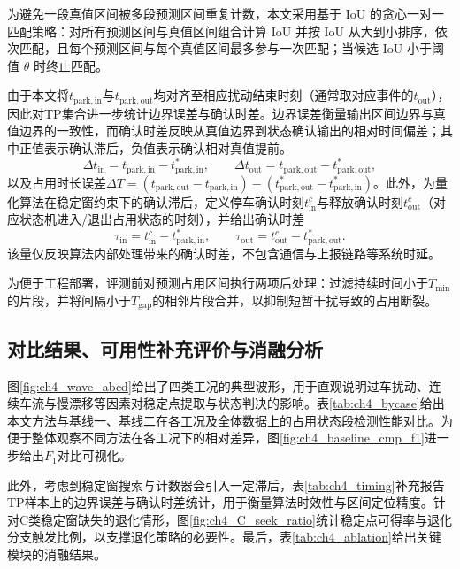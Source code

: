 为避免一段真值区间被多段预测区间重复计数，本文采用基于 IoU 的贪心一对一匹配策略：对所有预测区间与真值区间组合计算 IoU 并按 IoU 从大到小排序，依次匹配，且每个预测区间与每个真值区间最多参与一次匹配；当候选 IoU 小于阈值 $\theta$ 时终止匹配。

由于本文将$t_{\mathrm{park,in}}$与$t_{\mathrm{park,out}}$均对齐至相应扰动结束时刻（通常取对应事件的$t_{\mathrm{out}}$），因此对TP集合进一步统计边界误差与确认时差。边界误差衡量输出区间边界与真值边界的一致性，而确认时差反映从真值边界到状态确认输出的相对时间偏差；其中正值表示确认滞后，负值表示确认相对真值提前。
\begin{equation}
    \Delta t_{\mathrm{in}}=t_{\mathrm{park,in}}-t^{*}_{\mathrm{park,in}},\qquad
    \Delta t_{\mathrm{out}}=t_{\mathrm{park,out}}-t^{*}_{\mathrm{park,out}},
\end{equation}
以及占用时长误差$\Delta T=(t_{\mathrm{park,out}}-t_{\mathrm{park,in}})-(t^{*}_{\mathrm{park,out}}-t^{*}_{\mathrm{park,in}})$。此外，为量化算法在稳定窗约束下的确认滞后，定义停车确认时刻$t^{c}_{\mathrm{in}}$与释放确认时刻$t^{c}_{\mathrm{out}}$（对应状态机进入/退出占用状态的时刻），并给出确认时差
\begin{equation}
    \tau_{\mathrm{in}}=t^{c}_{\mathrm{in}}-t^{*}_{\mathrm{park,in}},\qquad
    \tau_{\mathrm{out}}=t^{c}_{\mathrm{out}}-t^{*}_{\mathrm{park,out}}.
\end{equation}
该量仅反映算法内部处理带来的确认时差，不包含通信与上报链路等系统时延。

为便于工程部署，评测前对预测占用区间执行两项后处理：过滤持续时间小于$T_{\min}$的片段，并将间隔小于$T_{\mathrm{gap}}$的相邻片段合并，以抑制短暂干扰导致的占用断裂。

\subsection{对比结果、可用性补充评价与消融分析}
\label{subsec:ch4_results}

图\ref{fig:ch4_wave_abcd}给出了四类工况的典型波形，用于直观说明过车扰动、连续车流与慢漂移等因素对稳定点提取与状态判决的影响。表\ref{tab:ch4_bycase}给出本文方法与基线一、基线二在各工况及全体数据上的占用状态段检测性能对比。为便于整体观察不同方法在各工况下的相对差异，图\ref{fig:ch4_baseline_cmp_f1}进一步给出$F_1$对比可视化。

此外，考虑到稳定窗搜索与计数器会引入一定滞后，表\ref{tab:ch4_timing}补充报告TP样本上的边界误差与确认时差统计，用于衡量算法时效性与区间定位精度。针对C类稳定窗缺失的退化情形，图\ref{fig:ch4_C_seek_ratio}统计稳定点可得率与退化分支触发比例，以支撑退化策略的必要性。最后，表\ref{tab:ch4_ablation}给出关键模块的消融结果。


